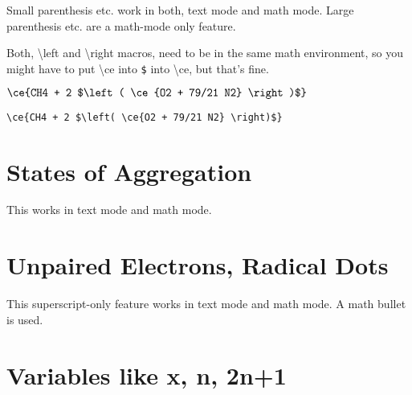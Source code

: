 \documentclass[a4paper,notitlepage,parskip=half]{scrreprt}
\newcommand\macro[1]{\mbox{\ttfamily\textbackslash#1}}
\begin{document}
Small parenthesis etc. work in both, text mode and math mode. Large parenthesis etc. are a math-mode only feature.

Both, \macro{left} and \macro{right} macros, need to be in the same math environment, so you might have to put \macro{ce} into \verb|$| into \macro{ce}, but that's fine.

$\displaystyle\ce{CH4 + 2 $\left( \ce{O2 + 79/21 N2} \right)$}$\par
{\raggedleft\verb|\ce{CH4 + 2 $\left( \ce{O2 + 79/21 N2} \right)$}|\par}


\section{States of Aggregation}

\begin{SideBySideExample}[xrightmargin=4cm]
\end{SideBySideExample}

\begin{SideBySideExample}[xrightmargin=4cm]
\end{SideBySideExample}

\begin{SideBySideExample}[xrightmargin=4cm]
\end{SideBySideExample}

This works in text mode and math mode.


\section{Unpaired Electrons, Radical Dots}

\begin{SideBySideExample}[xrightmargin=3cm]
\end{SideBySideExample}

\begin{SideBySideExample}[xrightmargin=3cm]
\end{SideBySideExample}

This superscript-only feature works in text mode and math mode. A math bullet is used.


\section {Variables like x, n, 2n+1}
\end{document}

